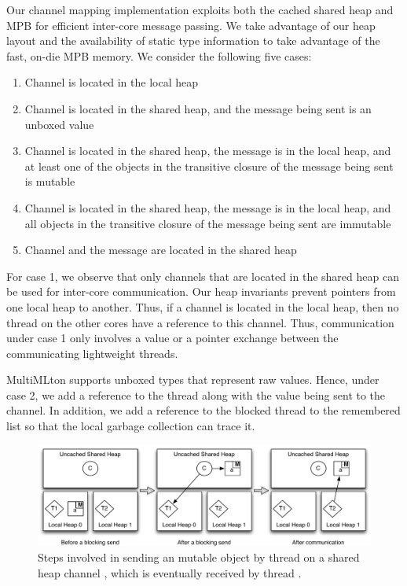 Our channel mapping implementation exploits both the cached shared heap and MPB
for efficient inter-core message passing. We take advantage of our heap layout
and the availability of static type information to take advantage of the fast,
on-die MPB memory. We consider the following five cases:

\begin{enumerate}
\item Channel is located in the local heap
\item Channel is located in the shared heap, and the message being sent is an
unboxed value
\item Channel is located in the shared heap, the message is in the local heap,
and at least one of the objects in the transitive closure of the message being
sent is mutable
\item Channel is located in the shared heap, the message is in the local heap,
and all objects in the transitive closure of the message being sent are
immutable
\item Channel and the message are located in the shared heap
\end{enumerate}

For case 1, we observe that only channels that are located in the shared heap
can be used for inter-core communication. Our heap invariants prevent pointers
from one local heap to another. Thus, if a channel is located in the local
heap, then no thread on the other cores have a reference to this channel. Thus,
communication under case 1 only involves a value or a pointer exchange between
the communicating lightweight threads.

MultiMLton supports unboxed types that represent raw values. Hence, under case
2, we add a reference to the thread along with the value being sent to the
channel. In addition, we add a reference to the blocked thread to the
remembered list so that the local garbage collection can trace it.

\begin{figure}
\centering
\includegraphics[width=1\textwidth]{Figures/Comm_Case_3}
\caption{Steps involved in sending an mutable object  by thread 
on a shared heap channel , which is eventually received by thread
.}
\label{fig:comm_mutable}
\end{figure}

